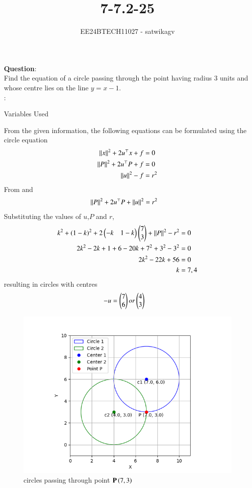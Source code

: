 \documentclass[journal]{IEEEtran}
\begin{document}

\vspace{3cm}

\title{7-7.2-25}
\author{EE24BTECH11027 - satwikagv}
{\let\newpage\relax\maketitle}

\renewcommand{\thefigure}{\theenumi}
\renewcommand{\thetable}{\theenumi}
\setlength{\intextsep}{10pt} %


\renewcommand{\thetable}{\theenumi}
\textbf{Question}:\\
Find the equation of a circle passing through the point  having radius 3 units and whose centre lies on the line $y=x-1$.\\
\solution:
\begin{table}[h!]    
  \centering
  
  \caption{Variables Used}
\end{table}
From the given information, the following equations can be formulated using the circle equation 
\begin{align}
\left\lVert x\right\rVert^2 + 2u^\top x + f &= 0\\
\left\lVert P\right\rVert^2 + 2u^\top P + f &= 0\\
\left\lVert u\right\rVert^2 - f &= r^2
\end{align}
From  and 
\begin{align}
	\left\lVert P\right\rVert^2 + 2u^\top P + \left\lVert u\right\rVert^2 &= r^2 	
\end{align}
Substituting the values of $u$,$P$ and $r$,
\begin{align}
	k^2+(1-k)^2+2\begin{pmatrix}-k&1-k\end{pmatrix}\begin{pmatrix}7\\3\end{pmatrix}+\left\lVert P\right\rVert^2-r^2 &= 0\\
	2k^2-2k+1+6-20k+7^2+3^2-3^2 &=0\\
	2k^2-22k+56 &=0\\
	k &=7,4
\end{align}
resulting in circles with centres 
\begin{align}
	-u&=\begin{pmatrix}7\\6\end{pmatrix} or \begin{pmatrix}4\\3\end{pmatrix}	
\end{align}
\begin{figure}[h!]
   \centering
   \includegraphics[width=0.7\linewidth]{figs/circle_plot.png}
   \caption{circles passing through point $\mathbf{P}\left(7,3\right)$}
\end{figure}
\end{document}
